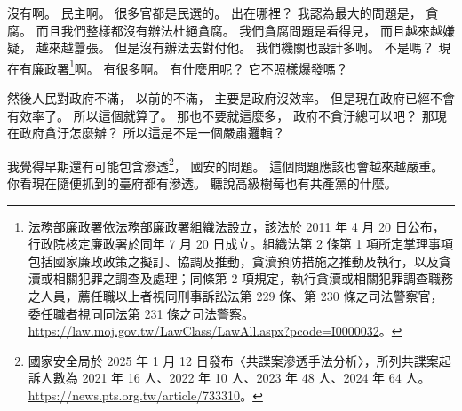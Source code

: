 \hypertarget{w01:cue:3087}{}沒有啊。
\hypertarget{w01:cue:3088}{}民主啊。
\hypertarget{w01:cue:3089}{}很多官都是民選的。
\hypertarget{w01:cue:3090}{}出在哪裡？
\hypertarget{w01:cue:3091}{}我認為最大的問題是，
\hypertarget{w01:cue:3092}{}貪腐。
\hypertarget{w01:cue:3093}{}而且我們整樣都沒有辦法杜絕貪腐。
\hypertarget{w01:cue:3094}{}我們貪腐問題是看得見，
\hypertarget{w01:cue:3095}{}而且越來越嫌疑，
\hypertarget{w01:cue:3096}{}越來越囂張。
\hypertarget{w01:cue:3097}{}但是沒有辦法去對付他。
\hypertarget{w01:cue:3098}{}我們機關也設計多啊。
\hypertarget{w01:cue:3099}{}不是嗎？
\hypertarget{w01:cue:3100}{}現在有廉政署\footnote{法務部廉政署依法務部廉政署組織法設立，該法於 2011 年 4 月 20 日公布，行政院核定廉政署於同年 7 月 20 日成立。組織法第 2 條第 1 項所定掌理事項包括國家廉政政策之擬訂、協調及推動，貪瀆預防措施之推動及執行，以及貪瀆或相關犯罪之調查及處理；同條第 2 項規定，執行貪瀆或相關犯罪調查職務之人員，薦任職以上者視同刑事訴訟法第 229 條、第 230 條之司法警察官，委任職者視同同法第 231 條之司法警察。\url{https://law.moj.gov.tw/LawClass/LawAll.aspx?pcode=I0000032}。}啊。
\hypertarget{w01:cue:3101}{}有很多啊。
\hypertarget{w01:cue:3102}{}有什麼用呢？
\hypertarget{w01:cue:3103}{}它不照樣爆發嗎？

\hypertarget{w01:cue:3104}{}然後人民對政府不滿，
\hypertarget{w01:cue:3105}{}以前的不滿，
\hypertarget{w01:cue:3106}{}主要是政府沒效率。
\hypertarget{w01:cue:3107}{}但是現在政府已經不會有效率了。
\hypertarget{w01:cue:3108}{}所以這個就算了。
\hypertarget{w01:cue:3109}{}那也不要就這麼多，
\hypertarget{w01:cue:3110}{}政府不貪汙總可以吧？
\hypertarget{w01:cue:3111}{}那現在政府貪汙怎麼辦？
\hypertarget{w01:cue:3112}{}所以這是不是一個嚴肅邏輯？

\hypertarget{w01:cue:3113}{}我覺得早期還有可能包含滲透\footnote{國家安全局於 2025 年 1 月 12 日發布〈共諜案滲透手法分析〉，所列共諜案起訴人數為 2021 年 16 人、2022 年 10 人、2023 年 48 人、2024 年 64 人。\url{https://news.pts.org.tw/article/733310}。}，
\hypertarget{w01:cue:3114}{}國安的問題。
\hypertarget{w01:cue:3115}{}這個問題應該也會越來越嚴重。
\hypertarget{w01:cue:3116}{}你看現在隨便抓到的臺府都有滲透。
\hypertarget{w01:cue:3117}{}聽說高級樹莓也有共產黨的什麼。

